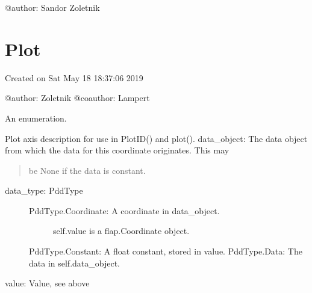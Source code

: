\documentclass[letterpaper,10pt,english]{sphinxmanual}
\begin{document}
@author: Sandor Zoletnik


\section{Plot}
\label{\detokenize{plot:module-flap.plot}}\label{\detokenize{plot:plot}}\label{\detokenize{plot::doc}}
Created on Sat May 18 18:37:06 2019

@author: Zoletnik
@coauthor: Lampert

\begin{fulllineitems}
\label{\detokenize{plot:flap.plot.PddType}}
An enumeration.

\end{fulllineitems}


\begin{fulllineitems}
\label{\detokenize{plot:flap.plot.PlotDataDescription}}
Plot axis description for use in PlotID() and plot().
data\_object: The data object from which the data for this coordinate originates. This may
\begin{quote}

be None if the data is constant.
\end{quote}
\begin{description}
\item[{data\_type: PddType}] \leavevmode\begin{description}
\item[{PddType.Coordinate: A coordinate in data\_object.}] \leavevmode
self.value is a flap.Coordinate object.

\end{description}

PddType.Constant: A float constant, stored in value.
PddType.Data: The data in self.data\_object.

\end{description}

value: Value, see above

\end{fulllineitems}
\end{document}
